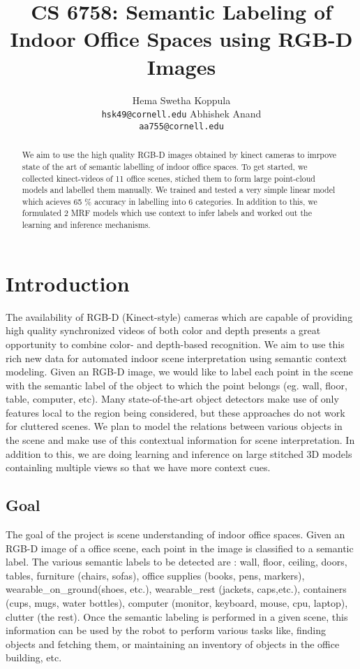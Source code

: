\documentclass[11pt]{article} %
\title{CS 6758: Semantic Labeling of Indoor Office Spaces using RGB-D Images}
\author{
Hema Swetha Koppula \\
 \texttt{hsk49@cornell.edu}
 \And
Abhishek Anand\\
 \texttt{aa755@cornell.edu}
}
\begin{document}
\maketitle

\begin{abstract}
We aim to use the high quality RGB-D images obtained by kinect cameras to imrpove state of the art of semantic labelling of indoor office spaces.
To get started, we  collected kinect-videos of 11 office scenes, stiched them to form large point-cloud models and labelled them manually.
We trained and tested a very simple linear model which acieves 65 \% accuracy in labelling into 6 categories. In addition to this, we formulated 2 MRF models which use context to infer labels and worked out the learning and inference mechanisms. 
\end{abstract}

\section{Introduction}


  
  The availability of  RGB-D (Kinect-style) cameras \cite{kinect} which are capable of providing high quality synchronized 
  videos of both color and depth presents a great opportunity to combine color- and depth-based recognition. We aim 
  to use this rich new data for automated indoor scene interpretation using semantic context modeling. Given an RGB-D 
  image, we would like to label each point in the scene with the semantic label of the object to which the point belongs
  (eg. wall, floor, table, computer, etc). Many state-of-the-art object detectors make use of only features local to the region being 
  considered, but these approaches do not work for cluttered scenes. We plan to model the relations between various objects 
  in the scene and make use of this contextual information for scene interpretation. In addition to this, we are doing learning and
  inference on large stitched 3D models containling multiple views so that we have more context cues.

   \subsection{Goal}
     The goal of the project is scene understanding of indoor office spaces. Given an RGB-D image of a office scene, each point in the 
     image is classified to a semantic label. The various semantic labels to be detected are : wall, floor, ceiling, doors, tables, furniture 
     (chairs, sofas), office supplies (books, pens, markers), wearable\_on\_ground(shoes, etc.), wearable\_rest (jackets, caps,etc.), 
     containers (cups, mugs, water bottles), computer (monitor, keyboard, mouse, cpu, laptop), clutter (the rest). Once the semantic labeling 
     is performed in a given scene, this information can be used by the robot to perform various tasks like, finding objects and fetching them, 
     or maintaining an inventory of objects in the office building, etc.
\end{document}
